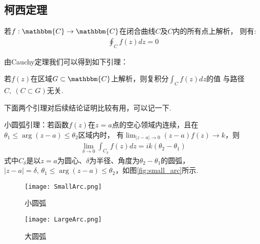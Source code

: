     \subsection{柯西定理}
        \begin{theorem}[Cauchy 定理]\label{the:cauchy_theorem}
            若$f:\mathbbm{C}\to\mathbbm{C}$在闭合曲线$C$及$C$内的所有点上解析，
            则有:
            \begin{align*}
                \oint_{C}f(z)dz = 0
            \end{align*}
        \end{theorem}

        由Cauchy定理我们可以得到如下引理：
        \begin{lemma}
            若$f(z)$在区域$G\subset\mathbbm{C}$上解析，则复积分$\int_{C}f(z)dz$的值
            与路径$C,\ (C \subset G)$无关.
        \end{lemma}

        下面两个引理对后续结论证明比较有用，可以记一下.
        \begin{lemma}
            \label{lem:small_arc_lemma}
            小圆弧引理：若函数$f(z)$在$z = a$点的空心领域内连续，且在$\theta_1 \leq \arg{(z - a)} \leq \theta_2$区域内时，
            有$\lim_{|z - a| \to 0}(z - a)f(z) \to k$，则
            \begin{align*}
                \lim_{\delta \to 0}\int_{C_\delta}f(z)dz = ik(\theta_2 - \theta_1)
            \end{align*}
            式中$C_\delta$是以$z = a$为圆心、$\delta$为半径、角度为$\theta_2 - \theta_1$的圆弧，
            $|z - a| = \delta,\,\theta_1 \leq \arg{(z - a)} \leq \theta_2$，如图\ref{fig:small_arc}所示.
        \end{lemma}

        \begin{figure}[htbp]
            \centering
            \begin{minipage}[t]{0.48\textwidth}
                \centering
                \texttt{[image: SmallArc.png]}
                \caption{小圆弧}
                \label{fig:small_arc}
            \end{minipage}
            \begin{minipage}[t]{0.48\textwidth}
                \centering
                \texttt{[image: LargeArc.png]}
                \caption{大圆弧}
                \label{fig:large_arc}
            \end{minipage}
        \end{figure}

